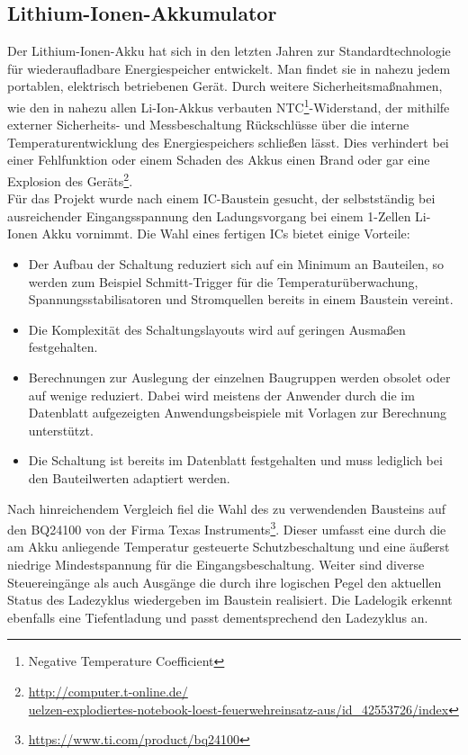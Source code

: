 \documentclass[12pt]{scrreprt} %
\begin{document}
\subsection{Lithium-Ionen-Akkumulator}
\label{chap:4.2.2}
 Der Lithium-Ionen-Akku hat sich in den letzten Jahren zur Standardtechnologie für wiederaufladbare Energiespeicher entwickelt. Man findet sie in nahezu jedem portablen, elektrisch betriebenen Gerät. Durch weitere Sicherheitsmaßnahmen, wie den in nahezu allen Li-Ion-Akkus verbauten NTC\footnote{Negative Temperature Coefficient}-Widerstand, der mithilfe externer Sicherheits- und Messbeschaltung Rückschlüsse über die interne Temperaturentwicklung des Energiespeichers schließen lässt. Dies verhindert bei einer Fehlfunktion oder einem Schaden des Akkus einen Brand oder gar eine Explosion des Geräts\footnote{\url{http://computer.t-online.de/} \\ \url{uelzen-explodiertes-notebook-loest-feuerwehreinsatz-aus/id_42553726/index}}. \\
Für das Projekt wurde nach einem IC-Baustein gesucht, der selbstständig bei ausreichender Eingangsspannung den Ladungsvorgang bei einem 1-Zellen Li-Ionen Akku vornimmt. Die Wahl eines fertigen ICs bietet einige Vorteile:
\begin{itemize}
\item
Der Aufbau der Schaltung reduziert sich auf ein Minimum an Bauteilen, so werden zum Beispiel Schmitt-Trigger für die Temperaturüberwachung, Spannungsstabilisatoren und Stromquellen bereits in einem Baustein vereint. 
\item
Die Komplexität des Schaltungslayouts wird auf geringen Ausmaßen festgehalten.
\item
Berechnungen zur Auslegung der einzelnen Baugruppen werden obsolet oder auf wenige reduziert. Dabei wird meistens der Anwender durch die im Datenblatt aufgezeigten Anwendungsbeispiele mit Vorlagen zur Berechnung unterstützt.
\item
Die Schaltung ist bereits im Datenblatt festgehalten und muss lediglich bei den Bauteilwerten adaptiert werden.
\end{itemize}
Nach hinreichendem Vergleich fiel die Wahl des zu verwendenden Bausteins auf den BQ24100 von der Firma Texas Instruments\footnote{\url{https://www.ti.com/product/bq24100}}. Dieser umfasst eine durch die am Akku anliegende Temperatur gesteuerte Schutzbeschaltung und eine äußerst niedrige Mindestspannung für die Eingangsbeschaltung. Weiter sind diverse Steuereingänge als auch Ausgänge die durch ihre logischen Pegel den aktuellen Status des Ladezyklus wiedergeben im Baustein realisiert. Die Ladelogik erkennt ebenfalls eine Tiefentladung und passt dementsprechend den Ladezyklus an. \\
\end{document}
